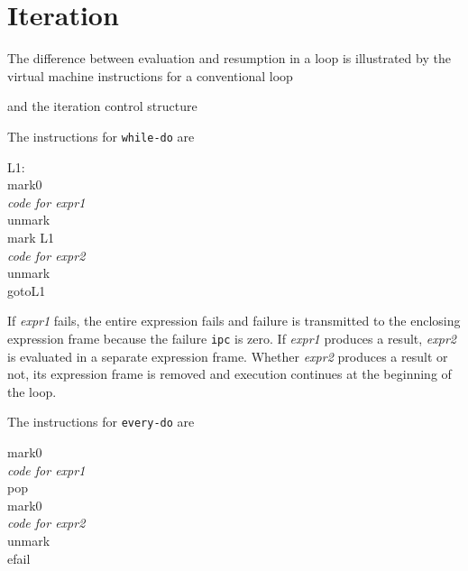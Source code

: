 \section{Iteration}

The difference between evaluation and resumption in a loop is
illustrated by the virtual machine instructions for a conventional
loop


\noindent and the iteration control structure


\noindent The instructions for \texttt{while-do} are

\begin{iconcode}
L1:\\
\>mark0\\
\>\textit{code for expr1}\\
\>unmark\\
\> mark\>\>\> L1\\
\>\textit{code for expr2}\\
\>unmark\\
\>goto\>\>\>L1
\end{iconcode}


If \textit{expr1} fails, the entire expression fails and failure is
transmitted to the enclosing expression frame because the failure
\texttt{ipc} is zero. If \textit{expr1} produces a result,
\textit{expr2} is evaluated in a separate expression frame. Whether
\textit{expr2} produces a result or not, its expression frame is
removed and execution continues at the beginning of the loop.

The instructions for \texttt{every-do} are

\begin{iconcode}
\>mark0\\
\>\textit{code for expr1}\\
\>pop\\
\>mark0\\
\>\textit{code for expr2}\\
\>unmark\\
\>efail
\end{iconcode}



